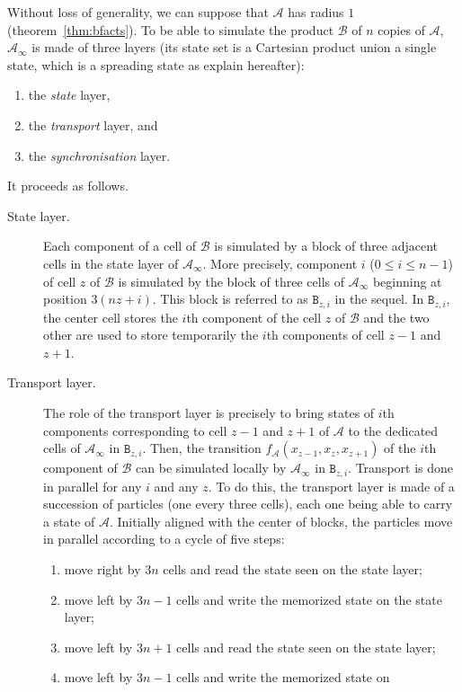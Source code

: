 \documentclass[a4paper]{elsarticle}
\newcommand{\ACA}{\mathcal{A}}
\newcommand{\ACB}{\mathcal{B}}
\newcommand{\locA}{f_{\ACA}}
\newcommand{\limprod}[1]{{\ACA}_\infty}
\newcommand\blc[1]{\texttt{B}_{#1}}
\begin{document}
Without loss of generality, we can suppose that $\ACA$ has radius $1$
(theorem~\ref{thm:bfacts}). To be able to simulate the product $\ACB$
of $n$ copies of $\ACA$, $\limprod{\ACA}$ is made of three layers (its
state set is a Cartesian product union a single state, which is a
spreading state as explain hereafter):
  \begin{enumerate}
  \item the \emph{state} layer,
  \item the \emph{transport} layer, and
  \item the \emph{synchronisation} layer.
  \end{enumerate} It proceeds as follows.
\begin{description}
\item[State layer.] Each component of a cell of $\ACB$ is simulated by a block of
  three adjacent cells in the state layer of $\limprod{\ACA}$.  More
  precisely, component $i$ (${0\leq i\leq n-1}$) of cell $z$ of $\ACB$
  is simulated by the block of three cells of $\limprod{\ACA}$ beginning
  at position ${3(nz+i)}$. This block is referred to as $\blc{z,i}$ in
  the sequel. In $\blc{z,i}$, the center cell stores the $i$th
  component of the cell $z$ of $\ACB$ and the two other are used to
  store temporarily the $i$th components of cell $z-1$ and $z+1$.
\item[Transport layer.] The role of the transport layer is precisely to bring states of
  $i$th components corresponding to cell $z-1$ and $z+1$ of $\ACA$ to
  the dedicated cells of $\limprod{\ACA}$ in $\blc{z,i}$. Then, the
  transition ${\locA(x_{z-1},x_{z},x_{z+1})}$ of the $i$th component of
  $\ACB$ can be simulated locally by $\limprod{\ACA}$ in
  $\blc{z,i}$. Transport is done in parallel for any $i$ and any
  $z$. To do this, the transport layer is made of a succession of
  particles (one every three cells), each one being able to carry a
  state of $\ACA$. Initially aligned with the center of blocks, the
  particles move in parallel according to a cycle of five steps:
  \begin{enumerate}
  \item move right by ${3n}$ cells and read the state seen on the state layer;
  \item move left by ${3n-1}$ cells and write the memorized state on
    the state layer;
  \item move left by ${3n+1}$ cells and read the state seen on the state layer;
  \item move left by ${3n-1}$ cells and write the memorized state on

\end{enumerate}
\end{description}
\end{document}
